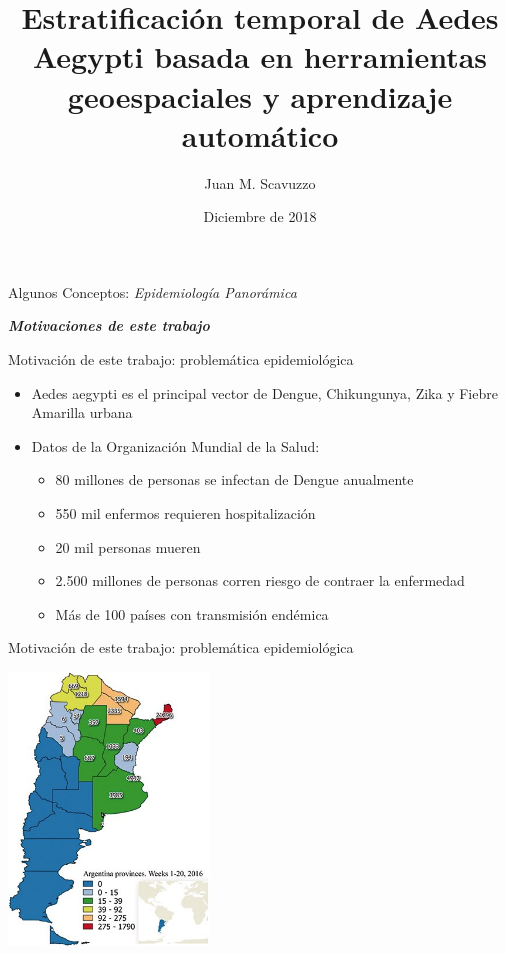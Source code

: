\documentclass[10pt]{beamer}
\title{Estratificación temporal de Aedes Aegypti basada en herramientas geoespaciales y aprendizaje automático}
\date{Diciembre de 2018}
\author{Juan M. Scavuzzo}
\institute{Facultad de Matemática, Astronomía, Física y Computación \\ Universidad Nacional de Córdoba}
\newcommand\IncrFont{\fontsize{20}{20}\selectfont}
\begin{document}
\maketitle

\begin{frame}{Algunos Conceptos: \textit{Epidemiología Panorámica}}
\IncrFont
  \begin{center}
    \textit{\textbf{Motivaciones de este trabajo}}
  \end{center}
\end{frame}



\begin{frame}{Motivación de este trabajo: problemática epidemiológica}
  \begin{itemize}[<+->]
   \item Aedes aegypti es el principal vector de Dengue, Chikungunya, Zika
         y Fiebre Amarilla urbana
   \item Datos de la Organización Mundial de la Salud:
    \begin{itemize}[<+->]
      \item 80 millones de personas se infectan de Dengue anualmente
      \item 550 mil enfermos requieren hospitalización
      \item 20 mil personas mueren
      \item 2.500 millones de personas corren riesgo de contraer la enfermedad
      \item Más de 100 países con transmisión endémica
    \end{itemize}
  \end{itemize}
\end{frame}



\begin{frame}{Motivación de este trabajo: problemática epidemiológica}

  \begin{center}
    \includegraphics[width=0.4\textwidth]{dengue}
  \end{center}

\end{frame}
\end{document}
